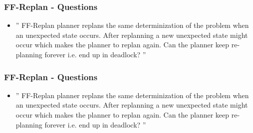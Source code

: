 \documentclass{beamer}
\let\origframetitle=\frametitle
\renewcommand\frametitle[1]{\origframetitle{\textbf{\large{\textrm{#1}}}}}
\begin{document}
\begin{frame}
  \frametitle{FF-Replan - Questions}
  \begin{itemize}
    \item '' FF-Replan planner replans the same determinization of the problem when an unexpected state occurs. After replanning a new unexpected state might occur which makes the planner to replan again. Can the planner keep re- planning forever i.e. end up in deadlock? ''

   \end{itemize}
\end{frame}


\begin{frame}
  \frametitle{FF-Replan - Questions}
  \begin{itemize}
    \item '' FF-Replan planner replans the same determinization of the problem when an unexpected state occurs. After replanning a new unexpected state might occur which makes the planner to replan again. Can the planner keep re- planning forever i.e. end up in deadlock? ''
   \end{itemize}
\end{frame}
\end{document}
